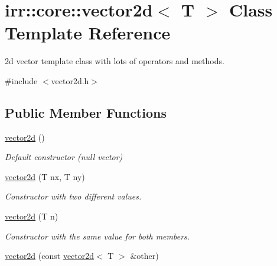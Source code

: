 \hypertarget{classirr_1_1core_1_1vector2d}{}\section{irr\+:\+:core\+:\+:vector2d$<$ T $>$ Class Template Reference}
\label{classirr_1_1core_1_1vector2d}


2d vector template class with lots of operators and methods.  




{\ttfamily \#include $<$vector2d.\+h$>$}

\subsection*{Public Member Functions}
\begin{DoxyCompactItemize}
\item 
\hyperlink{classirr_1_1core_1_1vector2d_a72c37c85b812bdaee77a32857d12bb7f}{vector2d} ()\hypertarget{classirr_1_1core_1_1vector2d_a72c37c85b812bdaee77a32857d12bb7f}{}\label{classirr_1_1core_1_1vector2d_a72c37c85b812bdaee77a32857d12bb7f}

\begin{DoxyCompactList}\small\item\em Default constructor (null vector) \end{DoxyCompactList}\item 
\hyperlink{classirr_1_1core_1_1vector2d_addeb85b77b2f8372609330c66ffe53b0}{vector2d} (T nx, T ny)\hypertarget{classirr_1_1core_1_1vector2d_addeb85b77b2f8372609330c66ffe53b0}{}\label{classirr_1_1core_1_1vector2d_addeb85b77b2f8372609330c66ffe53b0}

\begin{DoxyCompactList}\small\item\em Constructor with two different values. \end{DoxyCompactList}\item 
\hyperlink{classirr_1_1core_1_1vector2d_a88a082b80dbf6b5c221e5086fbade7e5}{vector2d} (T n)\hypertarget{classirr_1_1core_1_1vector2d_a88a082b80dbf6b5c221e5086fbade7e5}{}\label{classirr_1_1core_1_1vector2d_a88a082b80dbf6b5c221e5086fbade7e5}

\begin{DoxyCompactList}\small\item\em Constructor with the same value for both members. \end{DoxyCompactList}\item 
\hyperlink{classirr_1_1core_1_1vector2d_a8ebd20ef37425d42120c13aabdf63298}{vector2d} (const \hyperlink{classirr_1_1core_1_1vector2d}{vector2d}$<$ T $>$ \&other)\hypertarget{classirr_1_1core_1_1vector2d_a8ebd20ef37425d42120c13aabdf63298}{}\label{classirr_1_1core_1_1vector2d_a8ebd20ef37425d42120c13aabdf63298}


\end{DoxyCompactItemize}
